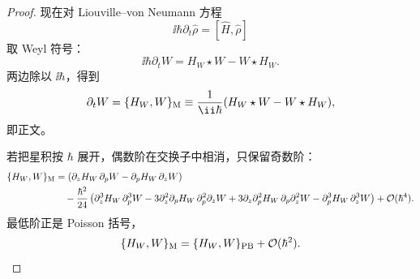 \begin{proof}
现在对 Liouville--von Neumann 方程
\[
\ii\hbar\partial_t\hat\rho
=
[\hat H,\hat\rho]
\]
取 Weyl 符号：
\[
\ii\hbar\partial_tW
=
H_W\star W-W\star H_W.
\]
两边除以 \(\ii\hbar\)，得到
\[
{
\partial_tW
=
\{H_W,W\}_{\rm M}
\equiv
\frac1{\ii\hbar}
(H_W\star W-W\star H_W),
}
\]
即正文。

若把星积按 \(\hbar\) 展开，偶数阶在交换子中相消，只保留奇数阶：
\begin{align*}
\{H_W,W\}_{\rm M}
&=
\left(
\partial_zH_W\,\partial_pW
-\partial_pH_W\,\partial_zW
\right)\\
&\quad
-\frac{\hbar^2}{24}
\left(
\partial_z^3H_W\,\partial_p^3W
-3\partial_z^2\partial_pH_W\,
  \partial_p^2\partial_zW
+3\partial_z\partial_p^2H_W\,
  \partial_p\partial_z^2W
-\partial_p^3H_W\,\partial_z^3W
\right)
+\mathcal O(\hbar^4).
\end{align*}
最低阶正是 Poisson 括号，
\[
\{H_W,W\}_{\rm M}
=
\{H_W,W\}_{\rm PB}
+\mathcal O(\hbar^2).
\]
\end{proof}


